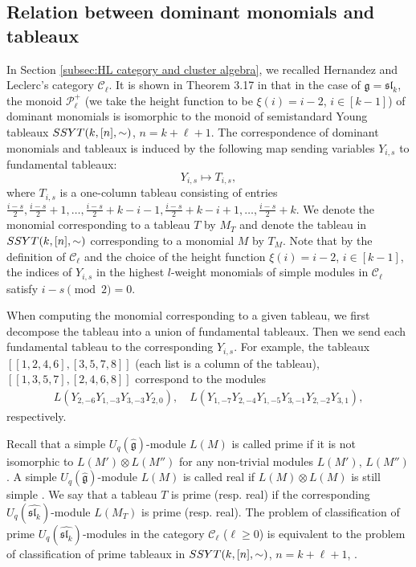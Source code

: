 \documentclass[12pt, reqno]{amsart}
\theoremstyle{plain}
\theoremstyle{definition}
\numberwithin{equation}{section}
\newcommand{\SSYT}{{\rm SSYT}}
\begin{document}
\subsection{Relation between dominant monomials and tableaux} \label{subsec:dominant monomials and tableaux}
 
In Section \ref{subsec:HL category and cluster algebra}, we recalled Hernandez and Leclerc's category $\mathcal{C}_{\ell}$. It is shown in Theorem 3.17 in \cite{CDFL} that in the case of $\mathfrak{g}=\mathfrak{sl}_k$, the monoid $\mathcal{P}^+_\ell$ (we take the height function to be $\xi(i)=i-2$, $i \in [k-1]$) of dominant monomials is isomorphic to the monoid of semistandard Young tableaux $\SSYT(k, [n], \sim)$, $n = k+\ell+1$. The correspondence of dominant monomials and tableaux is induced by the following map sending variables $Y_{i,s}$ to fundamental tableaux:
\begin{equation}\label{eq:monomToTableaux} 
Y_{i,s} \mapsto T_{i,s}, 
\end{equation}
where $T_{i,s}$ is a one-column tableau consisting of entries $\frac{i-s}{2}, \frac{i-s}{2}+1, \ldots, \frac{i-s}{2}+k-i-1, \frac{i-s}{2}+k-i+1, \ldots, \frac{i-s}{2}+k$. We denote the monomial corresponding to a tableau $T$ by $M_T$ and denote the tableau in ${\rm SSYT}(k, [n],\sim)$ corresponding to a monomial $M$ by $T_M$. Note that by the definition of $\mathcal{C}_{\ell}$ and the choice of the height function $\xi(i)=i-2$, $i \in [k-1]$, the indices of $Y_{i, s}$ in the highest $l$-weight monomials of simple modules in $\mathcal{C}_{\ell}$ satisfy $i-s \pmod 2=0$. 

When computing the monomial corresponding to a given tableau, we first decompose the tableau into a union of fundamental tableaux. Then we send each fundamental tableau to the corresponding $Y_{i,s}$. For example, the tableaux $[[1,2,4,6],[3,5,7,8]]$ (each list is a column of the tableau), $[[1,3,5,7],[2,4,6,8]]$ correspond to the modules
\begin{align*}
L(Y_{2,-6}Y_{1,-3}Y_{3,-3}Y_{2,0}), \quad L(Y_{1,-7}Y_{2,-4}Y_{1,-5}Y_{3,-1}Y_{2,-2}Y_{3,1}),
\end{align*}
respectively.   

Recall that a simple $U_q(\widehat{\mathfrak{g}})$-module $L(M)$ is called prime if it is not isomorphic to $L(M') \otimes L(M'')$ for any non-trivial modules $L(M')$, $L(M'')$ \cite{CP97}. A simple $U_q(\widehat{\mathfrak{g}})$-module $L(M)$ is called real if $L(M) \otimes L(M)$ is still simple \cite{Lec}. We say that a tableau $T$ is prime (resp. real) if the corresponding $U_q(\widehat{\mathfrak{sl}_k})$-module $L(M_T)$ is prime (resp. real). The problem of classification of prime $U_q(\widehat{\mathfrak{sl}_k})$-modules in the category $\mathcal{C}_{\ell}$ ($\ell \ge 0$) is equivalent to the problem of classification of prime tableaux in $\SSYT(k, [n], \sim)$, $n = k + \ell + 1$, \cite{CDFL}. 
\end{document}
